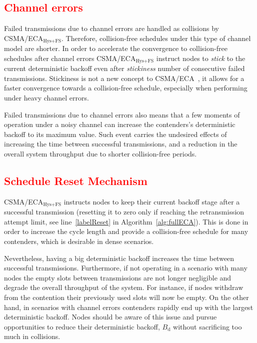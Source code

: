 %	

	\textcolor{red}{\subsection{Channel errors}}\label{errorEffect}
	Failed transmissions due to channel errors are handled as collisions by CSMA/ECA$_{\text{Hys+FS}}$. Therefore, collision-free schedules under this type of channel model are shorter. In order to accelerate the convergence to collision-free schedules after channel errors CSMA/ECA$_{\text{Hys+FS}}$ instruct nodes to \emph{stick} to the current deterministic backoff even after \emph{stickiness} number of consecutive failed transmissions. Stickiness is not a new concept to CSMA/ECA~\cite{barcelo2011tcf}, it allows for a faster convergence towards a collision-free schedule, especially when performing under heavy channel errors.
	
	Failed transmissions due to channel errors also means that a few moments of operation under a noisy channel can increase the contenders's deterministic backoff to its maximum value. Such event carries the undesired effects of increasing the time between successful transmissions, and a reduction in the overall system throughput due to shorter collision-free periods.
		
	\textcolor{red}{\subsection{Schedule Reset Mechanism}\label{schedReset}}
	CSMA/ECA$_{\text{Hys+FS}}$ instructs nodes to keep their current backoff stage after a successful transmission (resetting it to zero only if reaching the retransmission attempt limit, see line~\ref{labelReset} in Algorithm~\ref{alg:fullECA}). This is done in order to increase the cycle length and provide a collision-free schedule for many contenders, which is desirable in dense scenarios.
	
	Nevertheless, having a big deterministic backoff increases the time between successful transmissions. Furthermore, if not operating in a scenario with many nodes the empty slots between transmissions are not longer negligible and degrade the overall throughput of the system. For instance, if nodes withdraw from the contention their previously used slots will now be empty. On the other hand, in scenarios with channel errors contenders rapidly end up with the largest deterministic backoff. Nodes should be aware of this issue and pursue opportunities to reduce their deterministic backoff, $B_{\text{d}}$ without sacrificing too much in collisions. 
	
